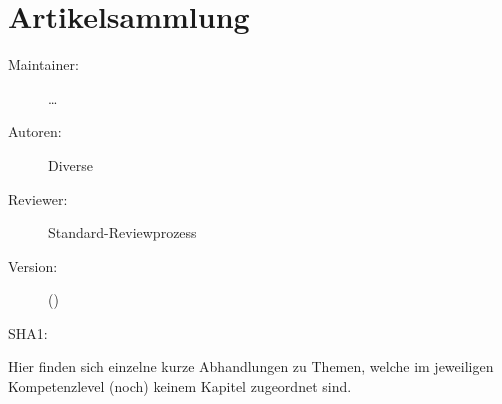 \def\ChapterCode{INTERMEDIATE}
\chapter
[\CO{[INTERMEDIATE]} Artikelsammlung]
{Artikelsammlung}
\label{chp:INTERMEDIATE-Artikel}

\ChapterIntro
{%

}
{%
\begin{description}
  \item[Maintainer:] \ldots
  \item[Autoren:] Diverse
  \item[Reviewer:] Standard-Reviewprozess
  \item[Version:] {\VarDocVersionTypeName} ({\VarDocVersionTypeDescription})
  \item[SHA1:] {\DocGitCommit}
\end{description}

{\TxTeilkapitelAASS}}

{\sffamily\noindent Hier finden sich einzelne kurze
Abhandlungen zu Themen, welche im jeweiligen Kompetenzlevel
(noch) keinem Kapitel zugeordnet sind.}

\clearpage %


\ChapterEnd